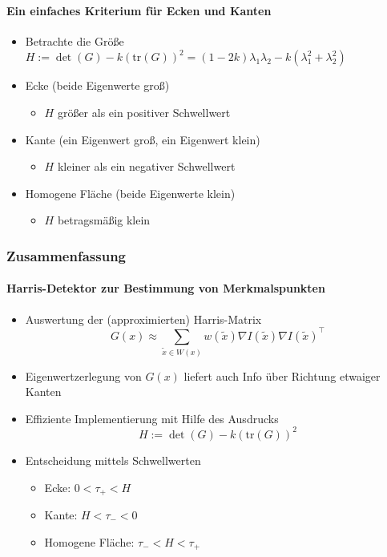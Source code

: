 \documentclass[12pt, a4paper, oneside]{article}
\begin{document}
\paragraph*{Ein einfaches Kriterium für Ecken und Kanten}
\begin{itemize}
    \item Betrachte die Größe $H:=\det(G)-k(\text{tr}(G))^2=(1-2k)\lambda_1\lambda_2-k(\lambda_1^2+\lambda_2^2)$
    \item Ecke (beide Eigenwerte groß)
    \begin{itemize}
        \item $H$ größer als ein positiver Schwellwert
    \end{itemize}
    \item Kante (ein Eigenwert groß, ein Eigenwert klein)
    \begin{itemize}
        \item $H$ kleiner als ein negativer Schwellwert
    \end{itemize}
    \item Homogene Fläche (beide Eigenwerte klein)
    \begin{itemize}
        \item $H$ betragsmäßig klein
    \end{itemize}
\end{itemize}

\subsubsection{Zusammenfassung}
\paragraph*{Harris-Detektor zur Bestimmung von Merkmalspunkten}
\begin{itemize}
    \item Auswertung der (approximierten) Harris-Matrix
    $$
    G(x)\approx \sum\limits_{\tilde{x}\in W(x)}w(\tilde{x})\nabla I(\tilde{x})\nabla I(\tilde{x})^\top
    $$
    \item Eigenwertzerlegung von $G(x)$ liefert auch Info über Richtung etwaiger Kanten 
    \item Effiziente Implementierung mit Hilfe des Ausdrucks
    $$
    H:=\det(G)-k(\text{tr}(G))^2
    $$
    \item Entscheidung mittels Schwellwerten
    \begin{itemize}
        \item Ecke: $0<\tau_+ <H$
        \item Kante: $H<\tau_- <0$
        \item Homogene Fläche: $\tau_- <H< \tau_+$
    \end{itemize}
\end{itemize}
\end{document}
